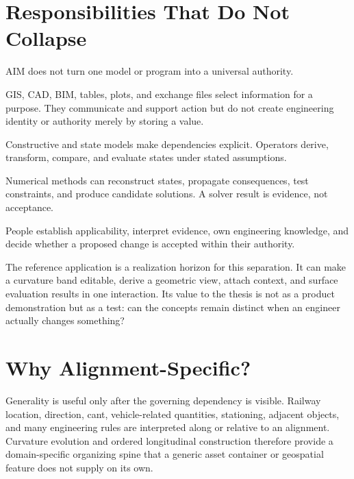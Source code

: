 \section{Responsibilities That Do Not Collapse}

AIM does not turn one model or program into a universal authority.

\begin{description}[style=nextline]
\item[Representations]
GIS, CAD, BIM, tables, plots, and exchange files select information for a
purpose. They communicate and support action but do not create engineering
identity or authority merely by storing a value.

\item[Models and operators]
Constructive and state models make dependencies explicit. Operators derive,
transform, compare, and evaluate states under stated assumptions.

\item[Computation]
Numerical methods can reconstruct states, propagate consequences, test
constraints, and produce candidate solutions. A solver result is evidence, not
acceptance.

\item[Engineers and accountable authorities]
People establish applicability, interpret evidence, own engineering knowledge,
and decide whether a proposed change is accepted within their authority.
\end{description}

The reference application is a realization horizon for this separation. It can
make a curvature band editable, derive a geometric view, attach context, and
surface evaluation results in one interaction. Its value to the thesis is not
as a product demonstration but as a test: can the concepts remain distinct when
an engineer actually changes something?

\section{Why Alignment-Specific?}

Generality is useful only after the governing dependency is visible. Railway
location, direction, cant, vehicle-related quantities, stationing, adjacent
objects, and many engineering rules are interpreted along or relative to an
alignment. Curvature evolution and ordered longitudinal construction therefore
provide a domain-specific organizing spine that a generic asset container or
geospatial feature does not supply on its own.


